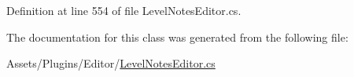 Definition at line 554 of file Level\+Notes\+Editor.\+cs.



The documentation for this class was generated from the following file\+:\begin{DoxyCompactItemize}
\item 
Assets/\+Plugins/\+Editor/\mbox{\hyperlink{_level_notes_editor_8cs}{Level\+Notes\+Editor.\+cs}}\end{DoxyCompactItemize}
